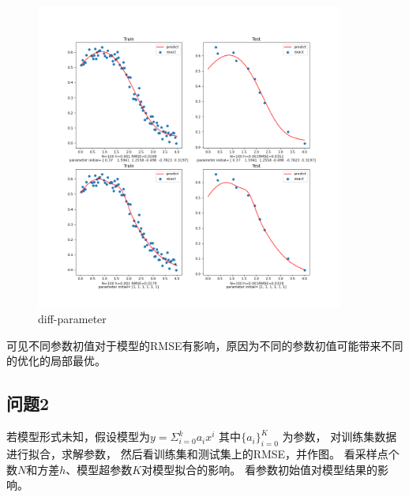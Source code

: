     \begin{figure}[H]
        \begin{center}
            \includegraphics[width=0.9\textwidth]{img/1-diff-para.png}
        \end{center}
       \caption[]{diff-parameter}
        \label{fig:diff-parameter}
    \end{figure}

    可见不同参数初值对于模型的RMSE有影响，原因为不同的参数初值可能带来不同的优化的局部最优。

 \subsection{问题2}
 若模型形式未知，假设模型为$y = \Sigma^k_{i=0} a_ix^i$ 其中$\{a_i\}^K_{i=0}$ 为参数，
 对训练集数据进行拟合，求解参数，
 然后看训练集和测试集上的RMSE，并作图。
 看采样点个数$N$和方差$h$、模型超参数$K$对模型拟合的影响。
 看参数初始值对模型结果的影响。

